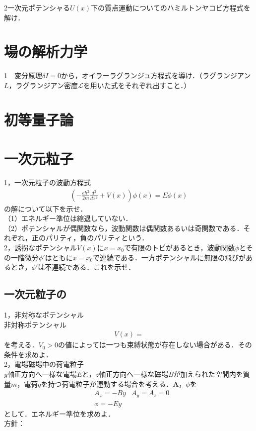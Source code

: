 \documentclass[a4j]{jarticle}
\begin{document}
2一次元ポテンシャる$U(x)$下の質点運動についてのハミルトンヤコビ方程式を解け．



\section{場の解析力学}
1　変分原理$\delta I=0$から，オイラーラグランジュ方程式を導け．（ラグランジアン$L$，ラグランジアン密度$\mathcal{L}$を用いた式をそれぞれ出すこと．）









\section{初等量子論}


\section{一次元粒子}
1，一次元粒子の波動方程式
\begin{align*}
 \left(-\frac{e\hbar^2}{2m}\frac{d^2}{dx^2}+V(x)\right)\phi (x)=E\phi (x)
\end{align*}
の解について以下を示せ．\\
（1）エネルギー準位は縮退していない．\\
（2）ポテンシャルが偶関数なら，波動関数は偶関数あるいは奇関数である．それぞれ，正のパリティ，負のパリティという．\\

2，誘拐なポテンシャル$V(x)$に$x=x_0$で有限のトビがあるとき，波動関数$\phi$とその一階微分$\phi'$はともに$x=x_0$で連続である．一方ポテンシャルに無限の飛びがあるとき，$\phi'$は不連続である．これを示せ．\\



\subsection{一次元粒子の}
1，非対称なポテンシャル\\
非対称ポテンシャル
\begin{align*}
 V(x)=
\end{align*}
を考える．$V_0>0$の値によっては一つも束縛状態が存在しない場合がある．その条件を求めよ．\\

2，電場磁場中の荷電粒子\\
$y$軸正方向へ一様な電場$E$と，$z$軸正方向へ一様な磁場$B$が加えられた空間内を質量$m$，電荷$q$を持つ荷電粒子が運動する場合を考える．${\bm A}$，$\phi$を
\begin{align*}
 &A_x=-By&A_y=A_z=0\\
 &\phi =-Ey&
\end{align*}
として．エネルギー準位を求めよ．\\
方針：
\end{document}
